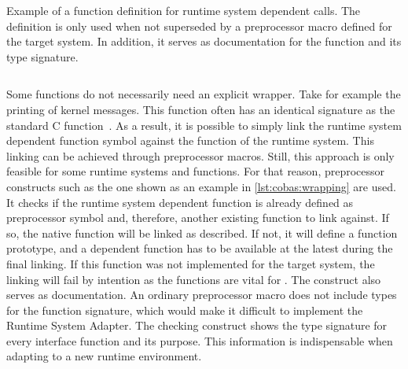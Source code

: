 \begin{listing}[t!]\centering
	\begin{minipage}{.925\textwidth}
		\captionsetup{margin=20pt}
		\caption[Example of a function definition for runtime system dependent calls.]{Example of a function definition for runtime system dependent calls. The definition is only used when not superseded by a preprocessor macro defined for the target system. In addition, it serves as documentation for the function and its type signature.
			\label{lst:cobas:wrapping}}\vspace{-6mm} \inputminted[linenos=false,fontsize=\footnotesize]{c}{listings/wrapping.c}
	\end{minipage}\vspace{-3mm}
\end{listing}

Some functions do not necessarily need an explicit wrapper. Take for example the printing of kernel messages. This function often has an identical signature as the standard C  function~\cite[\cf{}][Sec.~7.21.6.3]{ISO-C12}. As a result, it is possible to simply link the runtime system dependent function symbol against the function of the runtime system. This linking can be achieved through preprocessor macros. Still, this approach is only feasible for some runtime systems and functions. For that reason, preprocessor constructs such as the one shown as an example in \cref{lst:cobas:wrapping} are used. It checks if the runtime system dependent function is already defined as preprocessor symbol and, therefore, another existing function to link against. If so, the native function will be linked as described. If not, it will define a function prototype, and a dependent function has to be available at the latest during the final linking. If this function was not implemented for the target system, the linking will fail by intention as the functions are vital for \cobas{}. The construct also serves as documentation. An ordinary preprocessor macro does not include types for the function signature, which would make it difficult to implement the Runtime System Adapter. The checking construct shows the type signature for every interface function and its purpose. This information is indispensable when adapting \cobas{} to a new runtime environment.

